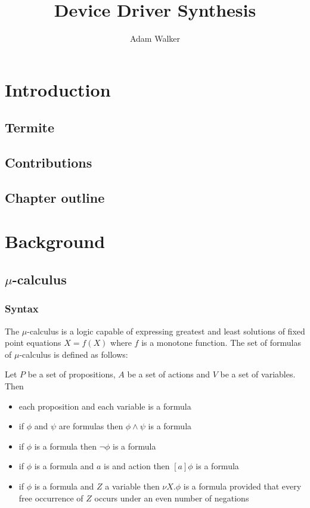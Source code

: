\documentclass[a4paper,twoside,openright,11pt]{book}
\title{Device Driver Synthesis}
\author{Adam Walker}
\theoremstyle{definition}
\begin{document}
\maketitle
\tableofcontents

\chapter{Introduction}

\section{Termite}
\section{Contributions}
\section{Chapter outline}

\chapter{Background}

\section{$\mu$-calculus}

\subsection{Syntax}

The $\mu$-calculus is a logic capable of expressing greatest and least solutions of fixed point equations $X = f(X)$ where $f$ is a monotone function. The set of formulas of $\mu$-calculus is defined as follows:

Let $P$ be a set of propositions, $A$ be a set of actions and $V$ be a set of variables. Then
\begin{itemize}
    \item each proposition and each variable is a formula
    \item if $\phi$ and $\psi$ are formulas then $\phi \wedge \psi$ is a formula
    \item if $\phi$ is a formula then $\neg \phi$ is a formula
    \item if $\phi$ is a formula and $a$ is and action then $[a]\phi$ is a formula
    \item if $\phi$ is a formula and $Z$ a variable then $\nu X.\phi$ is a formula provided that every free occurrence of $Z$ occurs under an even number of negations
\end{itemize}
\end{document}
